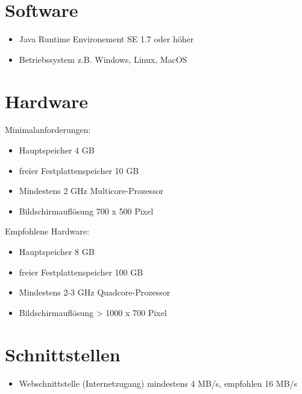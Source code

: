 ﻿%
\section{Software}
   \begin{itemize}
      \item Java Runtime Environement SE 1.7 oder höher
      \item Betriebssystem z.B. Windows, Linux, MacOS
   \end{itemize}
\section{Hardware}\label{empfohleneHardware}
	Minimalanforderungen:
   \begin{itemize}
      \item Hauptspeicher 4 GB
      \item freier Festplattenspeicher 10 GB
      \item Mindestens 2 GHz Multicore-Prozessor
      \item Bildschirmauflösung 700 x 500 Pixel
   \end{itemize}
   Empfohlene Hardware:
   \begin{itemize}
      \item Hauptspeicher 8 GB
      \item freier Festplattenspeicher 100 GB
      \item Mindestens 2-3 GHz Quadcore-Prozessor
      \item Bildschirmauflösung > 1000 x 700 Pixel
   \end{itemize}
\section{Schnittstellen}
   \begin{itemize}
   \item Webschnittstelle (Internetzugang) mindestens 4 MB/s, empfohlen 16 MB/s
   \end{itemize}
